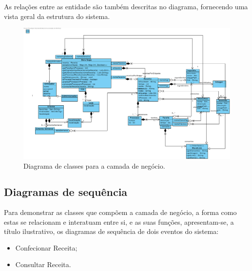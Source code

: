 As relações entre as entidade são também descritas no diagrama, fornecendo uma vista geral da estrutura do sistema.

 \begin{figure}[H]
   \centering
   \includegraphics[width=\textwidth]{figures/10/Diagrama_Classes.pdf}
   \caption{Diagrama de classes para a camada de negócio.}
   \label{fig:negocio:DiagramaClasses}
 \end{figure}

\subsection{Diagramas de sequência}
\label{subsec:diagramas_sequencia}

Para demonstrar as classes que compõem a camada de negócio, a forma como estas se relacionam e interatuam entre si, e as suas funções, apresentam-se, a título ilustrativo, os diagramas de sequência de dois eventos do sistema:

\begin{itemize}
    \item Confecionar Receita;
    \item Consultar Receita.
\end{itemize}

